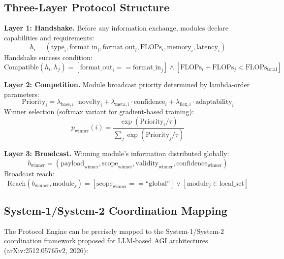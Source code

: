 \documentclass[11pt,a4paper]{article}
\theoremstyle{definition}
\theoremstyle{remark}
\newcommand{\GWP}{\text{GWP}}
\begin{document}
\subsection{Three-Layer Protocol Structure}\label{subsec:three-layer}

\textbf{Layer 1: Handshake.} Before any information exchange, modules declare capabilities and requirements:
\begin{equation}
h_i = (\text{type}_i, \text{format\_in}_i, \text{format\_out}_i, \text{FLOPs}_i, \text{memory}_i, \text{latency}_i)
\end{equation}
Handshake success condition:
\begin{equation}
\text{Compatible}(h_i, h_j) = [\text{format\_out}_i == \text{format\_in}_j] \land [\text{FLOPs}_i + \text{FLOPs}_j < \text{FLOPs}_{\text{total}}]
\end{equation}

\textbf{Layer 2: Competition.} Module broadcast priority determined by lambda-order parameters:
\begin{equation}
\text{Priority}_i = \lambda_{\text{base},i} \cdot \text{novelty}_i + \lambda_{\text{meta},i} \cdot \text{confidence}_i + \lambda_{\text{flex},i} \cdot \text{adaptability}_i
\end{equation}
Winner selection (softmax variant for gradient-based training):
\begin{equation}
p_{\text{winner}}(i) = \frac{\exp(\text{Priority}_i / \tau)}{\sum_j \exp(\text{Priority}_j / \tau)}
\end{equation}

\textbf{Layer 3: Broadcast.} Winning module's information distributed globally:
\begin{equation}
b_{\text{winner}} = (\text{payload}_{\text{winner}}, \text{scope}_{\text{winner}}, \text{validity}_{\text{winner}}, \text{confidence}_{\text{winner}})
\end{equation}
Broadcast reach:
\begin{equation}
\text{Reach}(b_{\text{winner}}, \text{module}_j) = [\text{scope}_{\text{winner}} == \text{``global''}] \lor [\text{module}_j \in \text{local\_set}]
\end{equation}

\subsection{System-1/System-2 Coordination Mapping}\label{subsec:system1-system2}

The \GWP{} Protocol Engine can be precisely mapped to the System-1/System-2 coordination framework proposed for LLM-based AGI architectures (arXiv:2512.05765v2, 2026):
\end{document}
